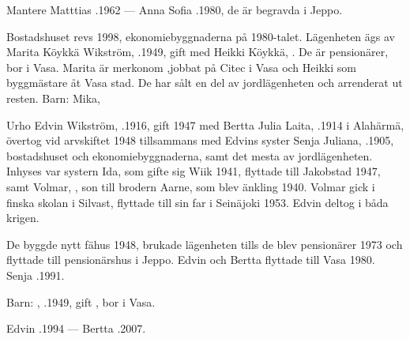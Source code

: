 Mantere Matttias .1962  ---  Anna Sofia .1980, de är begravda i Jeppo.






Bostadshuset revs 1998,  ekonomiebyggnaderna på 1980-talet. Lägenheten ägs av Marita Köykkä Wikström, .1949, gift med Heikki Köykkä, . De är pensionärer, bor i Vasa. Marita är merkonom ,jobbat på Citec i Vasa och Heikki som byggmästare åt Vasa stad. De har sålt en del av jordlägenheten och arrenderat ut resten.
Barn: Mika, 


Urho Edvin Wikström, .1916, gift 1947 med Bertta Julia Laita, .1914 i Alahärmä, övertog vid arvskiftet 1948 tillsammans med Edvins syster Senja Juliana, .1905, bostadshuset och ekonomiebyggnaderna, samt det mesta av jordlägenheten. Inhyses var systern Ida, som gifte sig Wiik 1941, flyttade till Jakobstad 1947, samt Volmar, , son till brodern Aarne, som blev änkling 1940. Volmar gick i finska skolan i Silvast, flyttade till sin far i Seinäjoki 1953. Edvin deltog i båda krigen.

De byggde nytt fähus 1948, brukade lägenheten tills de blev pensionärer 1973 och flyttade till pensionärshus i Jeppo. Edvin och Bertta flyttade till Vasa 1980. Senja .1991.

Barn: , .1949, gift , bor i Vasa.

Edvin .1994  ---  Bertta .2007.



